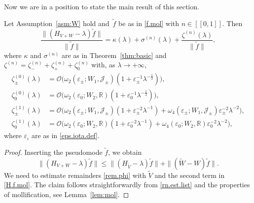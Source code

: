 Now we are in a position to state the main result of this section.
\begin{Theorem}\label{thm:mol}	Let Assumption~\ref{asm:W} hold 
and~$\tilde f$ be as in \eqref{f.mol} with $n \in[[0,1]]$. 
Then
\begin{equation}\label{HVW.f.mol}
\frac{\|(H_{V+W}-\lambda) \tilde f\|}{\|\tilde f\|} = \kappa(\lambda) + \sigma^{(n)}(\lambda) + \frac{\zeta^{(n)}(\lambda)}{\|\tilde f\|},
\end{equation}
where $\kappa$ and $\sigma^{(n)}$ are as in Theorem~\ref{thm:basic} and $\zeta^{(n)}= \zeta_-^{(n)} + \zeta_+^{(n)} + \zeta_0^{(n)}$ with, 
as $\lambda \to + \infty$,  
\begin{equation}
\begin{aligned}
\zeta_\pm^{(0)}(\lambda) 
& = {\mathcal{O}} \Big( \omega_2({\varepsilon}_\pm;W_1,{\mathcal J}_\pm) \left(1+  {\varepsilon}_\pm^{-1} \lambda^{- \frac 12}  \right)
 \Big),
\\
\zeta_0^{(0)}(\lambda)  
& = {\mathcal{O}} \Big( \omega_2({\varepsilon}_0;W_2,{\mathbb{R}}) \left(1+  {\varepsilon}_0^{-1} \lambda^{- \frac 12}  \right) 
 \Big),
\\
\zeta_\pm^{(1)}(\lambda)  
& = {\mathcal{O}} \Big( \omega_2({\varepsilon}_\pm;W_1,{\mathcal J}_\pm) \left(1+  {\varepsilon}_\pm^{-2} \lambda^{-1} \right)
+ \omega_4({\varepsilon}_\pm;W_1,{\mathcal J}_\pm) {\varepsilon}_\pm^{-2} \lambda^{-2}
\Big),
\\
\zeta_0^{(1)}(\lambda)  
& = {\mathcal{O}} \Big( \omega_2({\varepsilon}_0;W_2,{\mathbb{R}}) \left(1+ {\varepsilon}_0^{-2} \lambda^{-  1} \right) 
+
\omega_4({\varepsilon}_0;W_2,{\mathbb{R}}) {\varepsilon}_0^{-2} \lambda^{-2} 
\Big),
\end{aligned}
\end{equation}
where ${\varepsilon}_\iota$ are as in \eqref{eps.iota.def}. 
\end{Theorem}
\begin{proof}
Inserting the pseudomode $\tilde f$, we obtain
\begin{equation}\label{H.f.mol}
\|(H_{V+W}-\lambda) \tilde f\| 
\leq \|(H_{\tilde V}-\lambda) \tilde f\| + \|(\tilde W - W)\tilde f\|.
\end{equation}
We need to estimate remainders \eqref{rem.phi} with $\tilde V$ and the second term in \eqref{H.f.mol}. The claim follows straightforwardly from \eqref{rn.est.list} and the properties of mollification, see Lemma~\ref{lem:mol}.
\end{proof}

